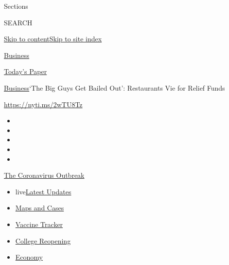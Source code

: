 Sections

SEARCH

\protect\hyperlink{site-content}{Skip to
content}\protect\hyperlink{site-index}{Skip to site index}

\href{https://www.nytimes3xbfgragh.onion/section/business}{Business}

\href{https://myaccount.nytimes3xbfgragh.onion/auth/login?response_type=cookie\&client_id=vi}{}

\href{https://www.nytimes3xbfgragh.onion/section/todayspaper}{Today's
Paper}

\href{/section/business}{Business}\textbar{}`The Big Guys Get Bailed
Out': Restaurants Vie for Relief Funds

\url{https://nyti.ms/2wTU8Tz}

\begin{itemize}
\item
\item
\item
\item
\item
\end{itemize}

\href{https://www.nytimes3xbfgragh.onion/news-event/coronavirus?action=click\&pgtype=Article\&state=default\&region=TOP_BANNER\&context=storylines_menu}{The
Coronavirus Outbreak}

\begin{itemize}
\tightlist
\item
  live\href{https://www.nytimes3xbfgragh.onion/2020/08/04/world/coronavirus-covid-19.html?action=click\&pgtype=Article\&state=default\&region=TOP_BANNER\&context=storylines_menu}{Latest
  Updates}
\item
  \href{https://www.nytimes3xbfgragh.onion/interactive/2020/us/coronavirus-us-cases.html?action=click\&pgtype=Article\&state=default\&region=TOP_BANNER\&context=storylines_menu}{Maps
  and Cases}
\item
  \href{https://www.nytimes3xbfgragh.onion/interactive/2020/science/coronavirus-vaccine-tracker.html?action=click\&pgtype=Article\&state=default\&region=TOP_BANNER\&context=storylines_menu}{Vaccine
  Tracker}
\item
  \href{https://www.nytimes3xbfgragh.onion/2020/08/02/us/covid-college-reopening.html?action=click\&pgtype=Article\&state=default\&region=TOP_BANNER\&context=storylines_menu}{College
  Reopening}
\item
  \href{https://www.nytimes3xbfgragh.onion/live/2020/08/03/business/stock-market-today-coronavirus?action=click\&pgtype=Article\&state=default\&region=TOP_BANNER\&context=storylines_menu}{Economy}
\end{itemize}

